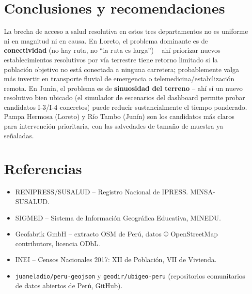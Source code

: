 \documentclass[11pt,a4paper]{article}
\begin{document}
\section{Conclusiones y recomendaciones}
La brecha de acceso a salud resolutiva en estos tres departamentos no es
uniforme ni en magnitud ni en causa. En Loreto, el problema dominante es de
\textbf{conectividad} (no hay ruta, no ``la ruta es larga'') -- ahí
priorizar nuevos establecimientos resolutivos por vía terrestre tiene
retorno limitado si la población objetivo no está conectada a ninguna
carretera; probablemente valga más invertir en transporte fluvial de
emergencia o telemedicina/estabilización remota. En Junín, el problema es
de \textbf{sinuosidad del terreno} -- ahí sí un nuevo resolutivo bien
ubicado (el simulador de escenarios del dashboard permite probar
candidatos I-3/I-4 concretos) puede reducir sustancialmente el tiempo
ponderado. Pampa Hermosa (Loreto) y Río Tambo (Junín) son los candidatos
más claros para intervención prioritaria, con las salvedades de tamaño de
muestra ya señaladas.

\section*{Referencias}
\begin{itemize}
  \item RENIPRESS/SUSALUD -- Registro Nacional de IPRESS. MINSA-SUSALUD.
  \item SIGMED -- Sistema de Información Geográfica Educativa, MINEDU.
  \item Geofabrik GmbH -- extracto OSM de Perú, datos © OpenStreetMap
        contributors, licencia ODbL.
  \item INEI -- Censos Nacionales 2017: XII de Población, VII de Vivienda.
  \item \texttt{juaneladio/peru-geojson} y \texttt{geodir/ubigeo-peru}
        (repositorios comunitarios de datos abiertos de Perú, GitHub).
\end{itemize}
\end{document}
